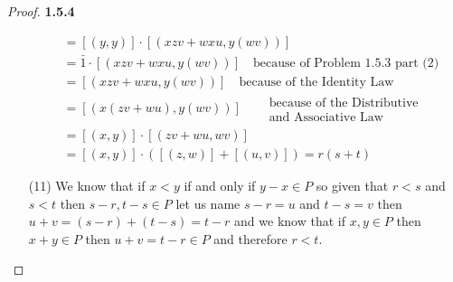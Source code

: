 \documentclass[11pt]{article}
\theoremstyle{definition}
\begin{document}
\begin{proof}{\textbf{1.5.4}}
\begin{itemize}
\begin{align*}
                &= [(y,y)]\cdot[(xzv + wxu, y(wv))]\\
                &= \bar{1} \cdot[(xzv + wxu, y(wv))] \quad \text{because of Problem 1.5.3 part (2)}\\
                &= [(xzv + wxu, y(wv))] \quad \text{because of the Identity Law}\\
                &= [(x(zv+wu),y(wv))] \quad \begin{aligned} &\text{because of the Distributive}\\
                                                            &\text{and Associative Law}\end{aligned}\\
                &= [(x,y)]\cdot[(zv+wu,wv)]\\
                &= [(x,y)]\cdot([(z,w)]+[(u,v)]) = r(s+t)
        \end{align*}
        \item [(11)]
        We know that if $x<y$ if and only if $y-x \in P$ so given that $r<s$ and $s<t$
        then $s-r, t-s \in P$ let us name $s-r = u$ and $t-s = v$ then
        $u+v = (s-r) + (t-s) = t-r$ and we know that if $x,y \in P$ then $x+y \in P$
        then $u+v = t-r \in P$ and therefore $r<t$. 
        \end{itemize}
    \end{proof}
\end{document}
